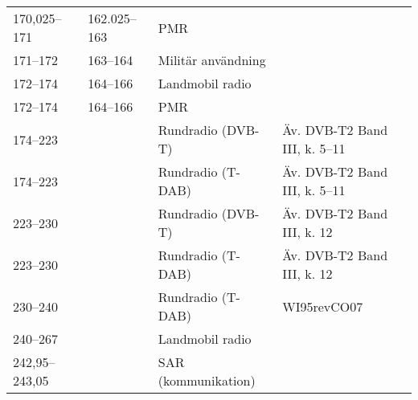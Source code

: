 \begin{landscape}
\begin{longtable}{llll}
	170,025--171       & 162.025--163       & PMR                                   &                                \\
	171--172           & 163--164           & Militär användning                    &                                \\
	172--174           & 164--166           & Landmobil radio                       &                                \\
	172--174           & 164--166           & PMR                                   &                                \\
	174--223           &                    & Rundradio (DVB-T)                     & Äv. DVB-T2 Band III, k. 5--11  \\
	174--223           &                    & Rundradio (T-DAB)                     & Äv. DVB-T2 Band III, k. 5--11  \\
	223--230           &                    & Rundradio (DVB-T)                     & Äv. DVB-T2 Band III, k. 12     \\
	223--230           &                    & Rundradio (T-DAB)                     & Äv. DVB-T2 Band III, k. 12     \\
	230--240           &                    & Rundradio (T-DAB)                     & WI95revCO07                    \\
	240--267           &                    & Landmobil radio                       &                                \\
	242,95--243,05     &                    & SAR (kommunikation)                   & 
\end{longtable}
\normalsize
\end{landscape}

